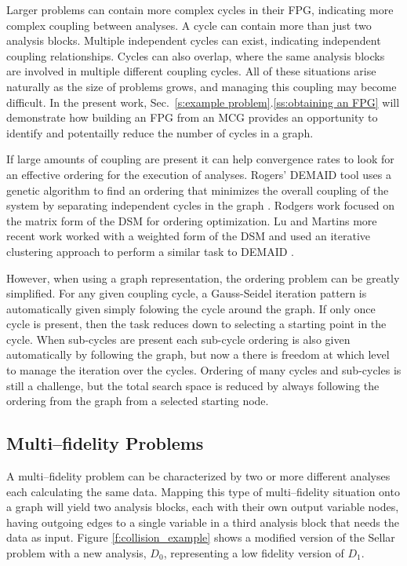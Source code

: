   Larger problems can contain more complex cycles in their FPG, indicating more 
  complex coupling between analyses. A cycle can contain more than 
  just two analysis blocks. Multiple independent cycles can exist, indicating 
  independent coupling relationships. Cycles can also overlap, where the same analysis 
  blocks are involved in multiple different coupling cycles. All of these situations
  arise naturally as the size of problems grows, and managing this coupling may
  become difficult. In the present work, Sec.~\ref{s:example problem}.\ref{ss:obtaining an FPG} 
  will demonstrate how building an FPG from an MCG provides an opportunity to 
  identify and potentailly reduce the number of cycles in a graph. 

  If large amounts of coupling are present it can help convergence 
  rates to look for an effective ordering for the execution of analyses.
  Rogers' DEMAID tool uses a genetic algorithm to find an ordering that minimizes 
  the overall coupling of the system by separating independent cycles in the 
  graph \cite{rogers1996,rogers1996demaid}. Rodgers work focused on the matrix 
  form of the DSM for ordering optimization. Lu and Martins more recent work 
  worked with a weighted form of the DSM and used an iterative clustering approach 
  to perform a similar task to DEMAID \cite{Lu2012}. 

  However, when using a graph representation, the ordering problem can be greatly 
  simplified. For any given coupling cycle, a Gauss-Seidel iteration pattern 
  is automatically given simply folowing the cycle around the graph. If only 
  once cycle is present, then the task reduces down to selecting a starting point
  in the cycle. When sub-cycles are present each sub-cycle ordering is also 
  given automatically by following the graph, but now a there is freedom at which 
  level to manage the iteration over the cycles. Ordering of many cycles and 
  sub-cycles is still a challenge, but the total search space is reduced by 
  always following the ordering from the graph from a selected starting node. 

\subsection{Multi--fidelity Problems}
  \label{ss:multi-fideliy problems}
  A multi--fidelity problem can be characterized by two or more different analyses 
  each calculating the same data. Mapping this type of multi--fidelity situation 
  onto a graph will yield two analysis blocks, each with their own output 
  variable nodes, having outgoing edges to a single variable in a third analysis 
  block that needs the data as input. Figure \ref{f:collision_example} shows 
  a modified version of the Sellar problem with a new analysis, $D_0$, representing a 
  low fidelity version of $D_1$. 

